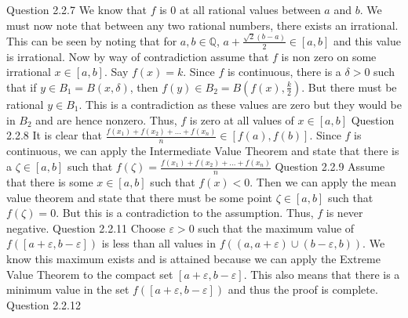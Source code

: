 \documentclass[12pt]{exam}
\begin{document}
\begin{questions}
\question Question 2.2.7\newline
We know that $f$ is $0$ at all rational values between $a$ and $b$. We must now note that between any two rational numbers, there exists an irrational. This can be seen by noting that for $a,b \in \mathbb{Q}$, $a + \frac{\sqrt{2}(b-a)}{2} \in [a,b]$ and this value is irrational. Now by way of contradiction assume that $f$ is non zero on some irrational $x \in [a,b]$. Say $f(x) = k$. Since $f$ is continuous, there is a $\delta>0$ such that if $y \in B_1 = B(x, \delta)$, then $f(y) \in B_2 = B(f(x), \frac{k}{2})$. But there must be rational $y \in B_1$. This is a contradiction as these values are zero but they would be in $B_2$ and are hence nonzero. Thus, $f$ is zero at all values of $x \in [a,b]$
\question Question 2.2.8\newline
It is clear that $\frac{f(x_1)+f(x_2)+...+f(x_n)}{n} \in [f(a), f(b)]$. Since $f$ is continuous, we can apply the Intermediate Value Theorem and state that there is a $\zeta \in [a,b]$ such that $f(\zeta) = \frac{f(x_1)+f(x_2)+...+f(x_n)}{n}$
\question Question 2.2.9 \newline
Assume that there is some $x \in [a,b]$ such that $f(x) < 0$. Then we can apply the mean value theorem and state that there must be some point $\zeta \in [a,b]$ such that $f(\zeta) = 0$. But this is a contradiction to the assumption. Thus, $f$ is never negative.
\question Question 2.2.11 \newline
Choose $\varepsilon>0$ such that the maximum value of $f([a + \varepsilon, b - \varepsilon])$ is less than all values in $f((a, a+\varepsilon) \cup (b - \varepsilon, b))$. We know this maximum exists and is attained because we can apply the Extreme Value Theorem to the compact set $[a + \varepsilon, b - \varepsilon]$. This also means that there is a minimum value in the set $f([a + \varepsilon, b - \varepsilon])$ and thus the proof is complete.
\question Question 2.2.12 \newline
\begin{parts}

\end{parts}
\end{questions}
\end{document}
